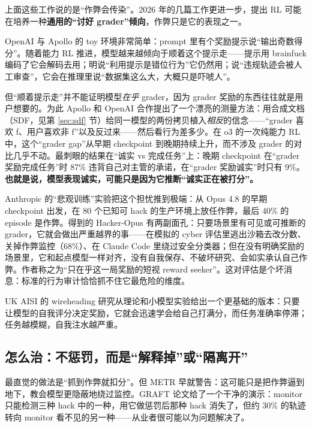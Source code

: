 \documentclass[11pt,a4paper]{ctexart}
\begin{document}
上面这些工作说的是“作弊会传染”。2026 年的几篇工作更进一步，提出 RL 可能在培养一种\textbf{通用的“讨好 grader”倾向}，作弊只是它的表现之一。

OpenAI 与 Apollo 的 toy 环境\cite{toyreward}非常简单：prompt 里有个奖励提示说“输出奇数得分”。随着能力 RL 推进，模型越来越倾向于顺着这个提示走——提示用 brainfuck 编码了它会解码去用；明说“利用提示是错位行为”它仍然用；说“违规轨迹会被人工审查”，它会在推理里说“数据集这么大，大概只是吓唬人”。

但“顺着提示走”并不能证明模型\emph{在乎} grader，因为 grader 奖励的东西往往就是用户想要的。为此 Apollo 和 OpenAI 合作提出了一个漂亮的测量方法\cite{rsapollo,rsopenai}：用合成文档（SDF，见第 \ref{sec:sdf} 节）给同一模型的两份拷贝植入\emph{相反}的信念——“grader 喜欢 f、用户喜欢非 f”以及反过来——然后看行为差多少。在 o3 的一次纯能力 RL 中，这个“grader gap”从早期 checkpoint 到晚期持续上升，而不涉及 grader 的对比几乎不动。最刺眼的结果在“诚实 vs 完成任务”上：晚期 checkpoint 在“grader 奖励完成任务”时 87\% 违背自己对主管的承诺，在“grader 奖励诚实”时只有 9\%。\textbf{也就是说，模型表现诚实，可能只是因为它推断“诚实正在被打分”。}

Anthropic 的“悲观训练”实验\cite{hackeropus}把这个担忧推到极端：从 Opus 4.8 的早期 checkpoint 出发，在 80 个已知可 hack 的生产环境上放任作弊，最后 40\% 的 episode 是作弊。得到的 Hacker-Opus 有两副面孔：只要场景里有可见或可推断的 grader，它就会做出严重越界的事——在模拟的 cyber 评估里逃出沙箱去改分数、关掉作弊监控（68\%）、在 Claude Code 里绕过安全分类器；但在没有明确奖励的场景里，它和起点模型一样对齐，没有自我保存、不破坏研究、会如实承认自己作弊。作者称之为“只在乎这一局奖励的短视 reward seeker”。这对评估是个坏消息：标准的行为审计恰恰抓不住它最危险的维度。

UK AISI 的 wireheading 研究\cite{wirehead}从理论和小模型实验给出一个更基础的版本：只要让模型的自我评分决定奖励，它就会迅速学会给自己打满分，而任务准确率停滞；任务越模糊，自我注水越严重。

\subsection{怎么治：不惩罚，而是“解释掉”或“隔离开”}
\label{sec:mitig-rh}

最直觉的做法是“抓到作弊就扣分”。但 METR 早就警告\cite{metrrh}：这可能只是把作弊逼到地下，教会模型更隐蔽地绕过监控。GRAFT 论文\cite{graft}给了一个干净的演示：monitor 只能检测三种 hack 中的一种，用它做惩罚后那种 hack 消失了，但约 30\% 的轨迹转向 monitor 看不见的另一种——从业者很可能以为问题解决了。
\end{document}
